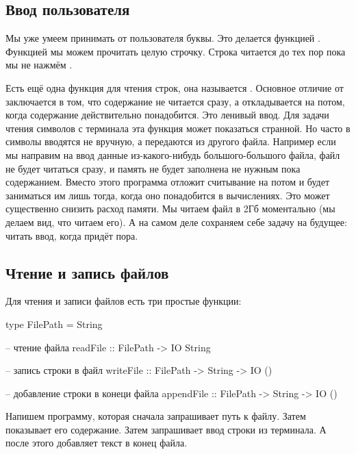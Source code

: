 \subsection{Ввод пользователя}

Мы уже умеем принимать от пользователя буквы. Это
делается функцией . Функцией 
мы можем прочитать целую строчку. Строка читается
до тех пор пока мы не нажмём .


Есть ещё одна функция для чтения строк, она называется
. Основное отличие от  
заключается в том, что содержание не читается сразу,
а откладывается на потом, когда содержание действительно
понадобится. Это ленивый ввод. Для задачи чтения символов
с терминала эта функция может показаться странной.
Но часто в символы вводятся не вручную, а передаются из 
другого файла. Например если мы направим на ввод данные
из-какого-нибудь большого-большого файла, файл не будет
читаться сразу, и память не будет заполнена не нужным 
пока содержанием. Вместо этого программа отложит считывание
на потом и будет заниматься им лишь тогда, когда оно понадобится
в вычислениях. Это может существенно снизить расход памяти.
Мы читаем файл в 2Гб моментально (мы делаем вид, что читаем его).
А на самом деле сохраняем себе задачу на будущее: читать ввод,
когда придёт пора.

\subsection{Чтение и запись файлов}

Для чтения и записи файлов есть три простые функции:

\begin{code}
type FilePath = String

-- чтение файла
readFile    :: FilePath -> IO String

-- запись строки в файл
writeFile   :: FilePath -> String -> IO ()

-- добавление строки в конеци файла
appendFile  :: FilePath -> String -> IO ()
\end{code}

Напишем программу, которая сначала запрашивает путь к файлу.
Затем показывает его содержание. Затем запрашивает ввод строки
из терминала. А после этого добавляет текст в конец файла.

